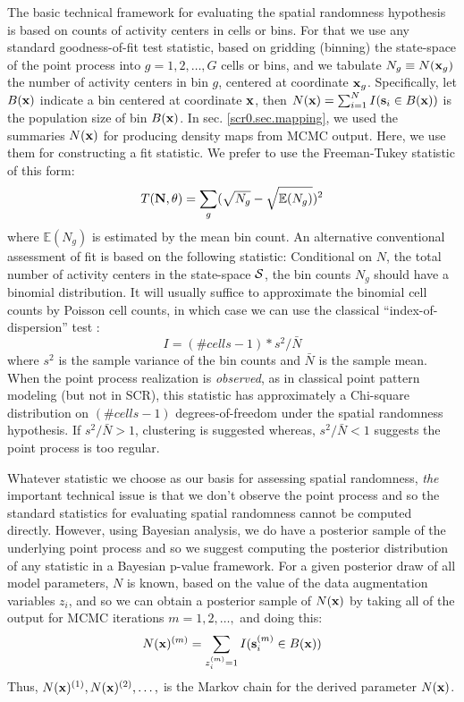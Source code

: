 The basic technical framework for evaluating the spatial randomness
hypothesis is based on counts of activity centers in cells or bins.
For that we use any standard goodness-of-fit test statistic, based on
gridding (binning) the state-space of the point process into
$g=1,2,\ldots,G$ cells or bins, and we tabulate $N_{g} \equiv N({\bf
  x}_{g})$ the number of activity centers in bin $g$, centered at
coordinate ${\bf x}_{g}$. 
Specifically, let $B({\bf x})$ indicate a bin centered at
coordinate ${\bf x}$, then $N({\bf x})=\sum_{i=1}^{N} I({\bf s}_{i} \in
B({\bf x}))$ is the population size of bin $B({\bf x})$. 
In 
sec. \ref{scr0.sec.mapping}, we used the summaries $N({\bf x})$ 
for producing density maps from MCMC output. Here, we use them for
constructing a fit statistic.
We prefer to use the 
Freeman-Tukey statistic of this form:
\[
T({\bf N}, \theta) =  \sum_{g}  (\sqrt{N_{g}} - \sqrt{\mathbb{E}(N_{g})})^{2}
\]
where $\mathbb{E}(N_{g})$ is estimated by the mean bin count.  An
alternative conventional assessment of fit is based on the following
statistic: Conditional on $N$, the total number of activity centers in
the state-space ${\cal S}$,
the bin counts $N_{g}$ should have a binomial distribution.  It will
usually suffice to approximate the binomial cell counts by Poisson
cell counts, in which case we can use the classical
``index-of-dispersion'' test \citep[][p. 87]{illian_etal:2008}:
\[
   I =  (\# cells -1)*s^2/\bar{N}
\]
where $s^{2}$ is the sample variance of the bin counts and $\bar{N}$
is the sample mean. When the point process realization is {\it
  observed}, as in classical point pattern modeling (but not in SCR), this statistic has approximately a Chi-square
distribution on $(\# cells - 1)$ degrees-of-freedom under the spatial
randomness hypothesis.  If $s^2/\bar{N} > 1$, clustering is suggested
whereas, $s^2/\bar{N} <1$ suggests the point process is too regular.


Whatever statistic we choose as our basis for assessing spatial
randomness, {\it the} important technical issue is that we don't
observe the point process and so the standard statistics for
evaluating spatial randomness cannot be computed directly.  However,
using Bayesian analysis, we do have a posterior sample of the
underlying point process and so we suggest computing the posterior
distribution of any statistic in a Bayesian p-value framework.
For a given
posterior draw of all model parameters, $N$ is known, based on the
value of the data augmentation variables $z_{i}$, and so we can obtain
a posterior sample of $N({\bf x})$ by taking all of the output for
MCMC iterations $m=1,2,\ldots,$ and doing this:
\[
   N({\bf x})^{(m)} = \sum_{z_{i}^{(m)}=1} I({\bf s}_{i}^{(m)} \in B({\bf x}))
\]
Thus, $N({\bf x})^{(1)}, N({\bf x})^{(2)}, \ldots,$ is the Markov
chain for the derived parameter $N({\bf x})$.

